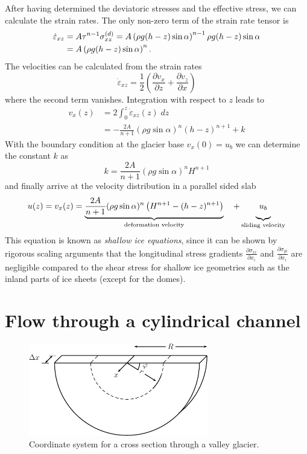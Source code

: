 \documentclass[11pt,DIV12,a4paper,halfparskip]{scrartcl}
\newcommand{\epsdot}{\dot{\varepsilon}}
\begin{document}
After having determined the deviatoric stresses and the effective stress, we
can calculate the strain rates.  The only non-zero term of the strain rate
tensor is 
%
\begin{align}
  \epsdot_{xz} &= A \tau^{n-1}\sigma^{(d)}_{xz}
  = A \left( \rho g (h-z) \sin\alpha \right)^{n-1}\rho g (h-z) \sin\alpha
  \notag\\
  &= A\left( \rho g (h-z) \sin\alpha \right)^{n}.
\end{align}
\newpage
The velocities can be calculated from the strain rates
%
\begin{equation*}
  \epsdot_{xz} = \frac{1}{2}\left( \frac{\partial v_x}{\partial z} + \frac{\partial v_z}{\partial x} \right)
\end{equation*}
%
where the second term vanishes.  Integration with respect to $z$ leads to
%
\begin{align*}
  v_x(z) &= 2 \int_0^z \epsdot_{xz}(z)\; dz\\
         &= - \frac{2A}{n+1} (\rho g \sin\alpha)^n (h-z)^{n+1} + k
\end{align*}
%
With the boundary condition at the glacier base $v_x(0)=u_b$ we can determine
the constant $k$ as
%
\begin{equation*}
  k = \frac{2A}{n+1} (\rho g \sin\alpha)^n H^{n+1}
\end{equation*}
%
and finally arrive at the velocity distribution in a parallel sided slab
%
\begin{equation}
  \label{eq:parallel-slab-velocity}
 u(z) = v_x(z) = \underbrace{\frac{2A}{n+1} (\rho g \sin\alpha)^n \left( H^{n+1}-(h-z)^{n+1}
  \right)}_{\text{deformation velocity}}\quad + \underbrace{u_b\rule[-1.9ex]{0ex}{1ex}}_{\text{sliding velocity}}
\end{equation}
%
This equation is known as \emph{shallow ice equations}, since it
can be shown by rigorous scaling arguments that the longitudinal stress
gradients $\frac{\partial \sigma_{xi}}{\partial x_{i}}$ and $\frac{\partial
  \sigma_{yi}}{\partial x_i}$ are negligible compared to the shear stress for
shallow ice geometries such as the inland parts of ice sheets (except for the
domes).


\section{Flow through a cylindrical channel}
\label{sec:flow-through-cylindrical-channel}

\begin{figure}[bhtp]
  \centering
  \includegraphics[width=0.7\textwidth]{figures/fig_channel}
  \caption{Coordinate system for a cross section through a valley glacier.  }
  \label{fig:valley-glacier-coord}
\end{figure}
\end{document}
